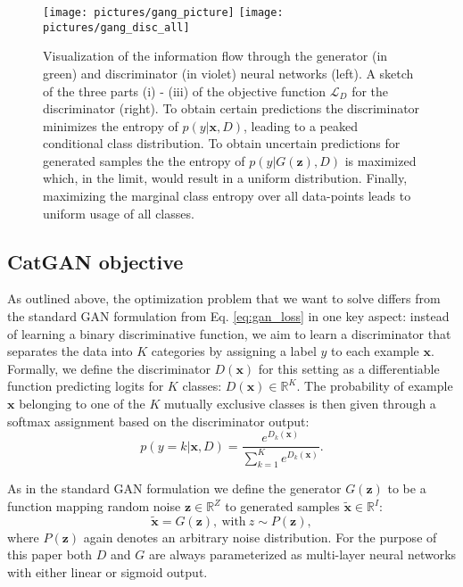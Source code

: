 \documentclass{article} \usepackage{iclr2016_conference,times}
\newcommand{\bx}{\mathbf{x}}
\newcommand{\bz}{\mathbf{z}}
\newcommand{\cLD}{\mathcal{L}_D}
\begin{document}
\begin{figure}
  \centering
  \texttt{[image: pictures/gang\_picture]} 
  \quad \quad
  \vline
  \quad \quad
\texttt{[image: pictures/gang\_disc\_all]}
\caption{Visualization of the information flow through the
      generator (in green) and discriminator (in violet) neural networks (left). A sketch
      of the three parts (i) - (iii) of the objective function $\cLD$ for the
      discriminator (right). To obtain certain predictions the
      discriminator minimizes the entropy of $p(y | \bx, D)$, leading
      to a peaked conditional class distribution. To obtain uncertain
      predictions for generated samples the the entropy of $p(y |
      G(\bz), D)$ is maximized which, in the limit, would result in a uniform
      distribution. Finally, maximizing the marginal class entropy
      over all data-points leads to uniform usage of all classes.}
  \label{fig:reqs}
\end{figure}

\subsection{CatGAN objective}
\label{sect:objective}
As outlined above, the optimization problem that we want to solve
differs from the standard GAN formulation from Eq. \eqref{eq:gan_loss}
in one key aspect: instead of learning a binary discriminative
function, we aim to learn a discriminator that separates the data into
$K$ categories by assigning a label $y$ to each example
$\bx$. Formally, we define the discriminator $D(\bx)$ for this setting
as a differentiable function predicting logits for $K$ classes:
$D(\bx) \in \mathbb{R}^K$. The probability of example $\bx$ belonging
to one of the $K$ mutually exclusive classes is then given through a
softmax assignment based on the discriminator output:
\begin{equation}
  p(y = k | \bx, D) = \frac{e^{D_k(\bx)}}{\sum^K_{k=1} e^{D_k(\bx)}}.
\end{equation}

As in the standard GAN formulation we define the generator $G(\bz)$ to
be a function mapping random noise $\bz \in \mathbb{R}^Z$ to generated 
samples $\tilde{\bx} \in \mathbb{R}^I$:
\begin{equation}
  \tilde{\bx} = G(\bz), \ \text{with} \ z \sim P(\bz),
\end{equation}
where $P(\bz)$ again denotes an arbitrary noise distribution. For the
purpose of this paper both $D$ and $G$ are always parameterized as multi-layer
neural networks with either linear or sigmoid output. 
\end{document}
